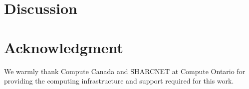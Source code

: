 \documentclass[11pt]{IEEEtran}
\begin{document}





\section{Discussion}










\section{Acknowledgment}

We warmly thank Compute Canada and SHARCNET at Compute Ontario for
providing the computing infrastructure and support required for this work. 
\end{document}

